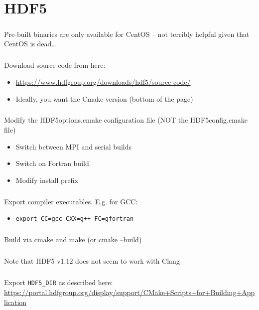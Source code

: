 \documentclass[a4paper,10pt]{report}
\begin{document}
\chapter{HDF5}
\paragraph{} Pre-built binaries are only available for CentOS – not terribly helpful given that CentOS is dead…
\paragraph{} Download source code from here:
\begin{itemize}
    \item \url{https://www.hdfgroup.org/downloads/hdf5/source-code/}
    \item Ideally, you want the Cmake version (bottom of the page)
 \end{itemize}
\paragraph{} Modify the HDF5options.cmake configuration file (NOT the HDF5config.cmake file)
\begin{itemize}
    \item Switch between MPI and serial builds
    \item Switch on Fortran build
    \item Modify install prefix
 \end{itemize}
\paragraph{} Export compiler executables. E.g. for GCC:
\begin{itemize}
    \item \verb|export CC=gcc CXX=g++ FC=gfortran|
 \end{itemize}
\paragraph{} Build via cmake and make (or cmake --build)
\paragraph{} Note that HDF5 v1.12 does not seem to work with Clang
\paragraph{} Export \verb|HDF5_DIR| as described here: \url{https://portal.hdfgroup.org/display/support/CMake+Scripts+for+Building+Application}
\end{document}
